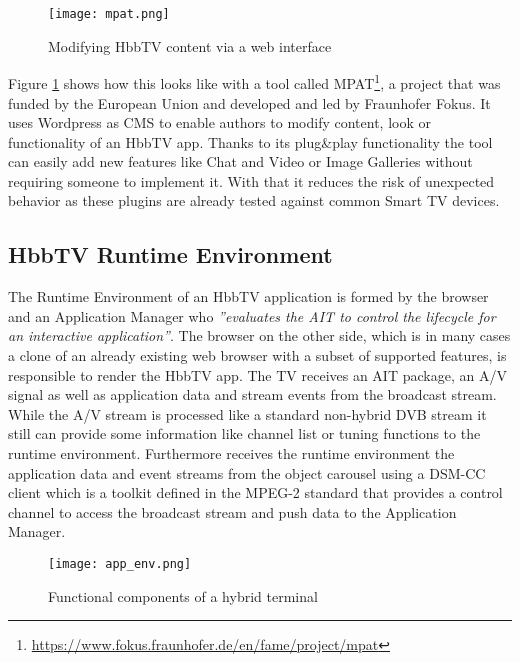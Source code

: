 \begin{figure}[htb]
  \centering
  \texttt{[image: mpat.png]}\\
  \caption{
    Modifying HbbTV content via a web interface
  }
  \label{fig:mpat}
\end{figure}

Figure \ref{fig:mpat} shows how this looks like with a tool called MPAT\footnote{\url{https://www.fokus.fraunhofer.de/en/fame/project/mpat}}, a project that was funded by the European Union and developed and led by Fraunhofer Fokus. It uses Wordpress as CMS to enable authors to modify content, look or functionality of an HbbTV app. Thanks to its plug\&play functionality the tool can easily add new features like Chat and Video or Image Galleries without requiring someone to implement it. With that it reduces the risk of unexpected behavior as these plugins are already tested against common Smart TV devices.

\subsection{HbbTV Runtime Environment\label{sec:hbbtvruntimeenvironment}}

The Runtime Environment of an HbbTV application is formed by the browser and an Application Manager who \textit{''evaluates the AIT to control the lifecycle for an interactive application''}\cite{hbbtv15}. The browser on the other side, which is in many cases a clone of an already existing web browser with a subset of supported features, is responsible to render the HbbTV app. The TV receives an AIT package, an A/V signal as well as application data and stream events from the broadcast stream. While the A/V stream is processed like a standard non-hybrid DVB stream it still can provide some information like channel list or tuning functions to the runtime environment. Furthermore receives the runtime environment the application data and event streams from the object carousel using a DSM-CC client which is a toolkit defined in the MPEG-2 standard that provides a control channel to access the broadcast stream and push data to the Application Manager.

\begin{figure}[htb]
  \centering
  \texttt{[image: app\_env.png]}\\
  \caption{
    Functional components of a hybrid terminal
  }
  \label{fig:app_env}
\end{figure}

